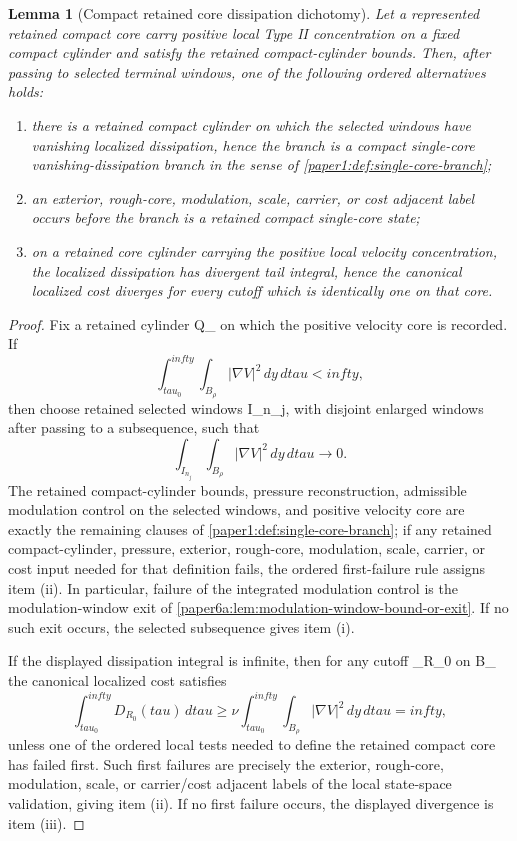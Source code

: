 \documentclass[11pt]{amsart}
\def\({}%
\def\){}%
\def\tilde#1{#1}%
\def\mathfrak#1{#1}%
\def\tau{tau}%
\def\infty{infty}%
\theoremstyle{plain}
\newtheorem{lemma}[lemma]{Lemma}
\theoremstyle{definition}
\theoremstyle{remark}
\begin{document}
\begin{lemma}[Compact retained core dissipation dichotomy]
\label{paper6:lem:compact-core-dissipation-dichotomy}
Let a represented retained compact core carry positive local Type II
concentration on a fixed compact cylinder and satisfy the retained
compact-cylinder bounds.  Then, after passing to selected terminal windows, one
of the following ordered alternatives holds:
\begin{enumerate}[label=\textup{(\roman*)}]
\item there is a retained compact cylinder on which the selected windows have
vanishing localized dissipation, hence the branch is a compact single-core
vanishing-dissipation branch in the sense of
\cref{paper1:def:single-core-branch};
\item an exterior, rough-core, modulation, scale, carrier, or cost adjacent
label occurs before the branch is a retained compact single-core state;
\item on a retained core cylinder carrying the positive local velocity concentration, the
localized dissipation has divergent tail integral, hence the canonical
localized cost diverges for every cutoff which is identically one on that core.
\end{enumerate}
\end{lemma}

\begin{proof}
Fix a retained cylinder \(Q_\rho\) on which the positive velocity core is
recorded.  If
\[
  \int_{\tau_0}^{\infty}\int_{B_\rho}|\nabla V|^2\,dy\,d\tau<\infty,
\]
then choose retained selected windows \(I_{n_j}\), with disjoint enlarged
windows after passing to a subsequence, such that
\[
  \int_{I_{n_j}}\int_{B_\rho}|\nabla V|^2\,dy\,d\tau\to0 .
\]
The retained compact-cylinder bounds, pressure reconstruction, admissible
modulation control on the selected windows, and positive velocity core are
exactly the remaining clauses of \cref{paper1:def:single-core-branch}; if any
retained compact-cylinder, pressure, exterior, rough-core, modulation, scale,
carrier, or cost input needed for that definition fails, the ordered
first-failure rule assigns item \textup{(ii)}.  In particular, failure of the
integrated modulation control is the modulation-window exit of
\cref{paper6a:lem:modulation-window-bound-or-exit}.  If no such exit occurs,
the selected subsequence gives item \textup{(i)}.
\par
If the displayed dissipation integral is infinite, then for any cutoff
\(\phi_{R_0}\) on \(B_\rho\) the canonical localized cost satisfies
\[
  \int_{\tau_0}^{\infty}\tilde{\mathfrak D}_{R_0}(\tau)\,d\tau
  \ge
  \nu\int_{\tau_0}^{\infty}\int_{B_\rho}|\nabla V|^2\,dy\,d\tau
  =\infty,
\]
unless one of the ordered local tests needed to define the retained compact
core has failed first.  Such first failures are precisely the exterior,
rough-core, modulation, scale, or carrier/cost adjacent labels of the local
state-space validation, giving item \textup{(ii)}.  If no first failure occurs,
the displayed divergence is item \textup{(iii)}.
\end{proof}
\end{document}
